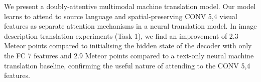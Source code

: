 We present a doubly-attentive multimodal machine translation model. Our model learns to attend to source language and spatial-preserving CONV 5,4 visual features as separate attention mechanisms in a neural translation model. In image description translation experiments (Task 1), we find an improvement of 2.3 Meteor points compared to initialising the hidden state of the decoder with only the FC 7 features and 2.9 Meteor points compared to a text-only neural machine translation baseline, confirming the useful nature of attending to the CONV 5,4 features.
